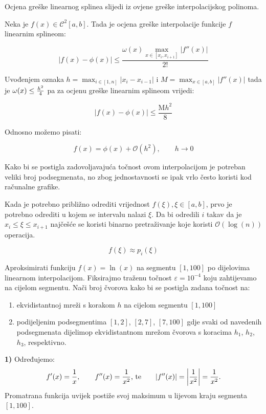 Ocjena greške linearnog splinea slijedi iz ovjene greške interpolacijskog polinoma.

Neka je $f(x)\in\mathcal{C}^2[a,b]$. Tada je ocjena greške interpolacije funkcije $f$ linearnim splineom:

$$
|f(x)-\phi(x)| \leq \frac{\omega(x)\max_{x\in[x_i,x_{i+1}]}|f''(x)|}{2!}
$$

Uvođenjem oznaka $h=\max_{i\in[1,n]}|x_i-x_{i-1}|$ i $M=\max_{x\in[a,b]}|f''(x)|$ tada je $\omega(x)\leq{h^2\over4}$ pa za ocjenu greške linearnim splineom vrijedi:

$$
|f(x) - \phi(x)|\leq \frac{\text{M}h^2}{8}
$$

Odnosno možemo pisati:

\begin{equation*}
    f(x) = \phi(x) + \mathcal{O}(h^2),\qquad h\to0
\end{equation*}

Kako bi se postigla zadovoljavajuća točnost ovom interpolacijom je potreban veliki broj podsegmenata, no zbog jednostavnosti se ipak vrlo često koristi kod računalne grafike.

Kada je potrebno približno odrediti vrijednost $f(\xi), \xi\in[a,b]$, prvo je potrebno odrediti u kojem se intervalu nalazi $\xi$. Da bi odredili $i$ takav da je $x_i\leq\xi\leq x_{i+1}$ najčešće se koristi binarno pretraživanje koje koristi $\mathcal{O}(\log(n))$ operacija.

$$
f(\xi)\approx p_i(\xi)
$$

\newpage

\begin{examplebox}
    Aproksimirati funkciju $f(x) = \ln(x)$ na segmentu $[1,100]$ po dijelovima linearnom interpolacijom. Fiksirajmo traženu točnost $\varepsilon = 10^{-4}$ koju zahtijevamo na cijelom segmentu. Nači broj čvorova kako bi se postigla zadana točnost na:

    \begin{enumerate}
        \item ekvidistantnoj mreži s korakom $h$ na cijelom segmentu $[1,100]$
        \item podijeljenim podsegmentima $[1,2]$, $[2,7]$, $[7,100]$ gdje svaki od navedenih podsegmenata dijelimop ekvidistantnom mrežom čvorova s koracima $h_1$, $h_2$, $h_3$, respektivno.
    \end{enumerate}
\end{examplebox}

\textbf{1)} Određujemo:
    $$
    f'(x) = {1\over x},\qquad f''(x)={1\over x^2}\text{, te}\qquad |f''(x)|=\left|{1\over x^2}\right|={1\over x^2}.
    $$
    Promatrana funkcija uvijek postiže svoj maksimum u lijevom kraju segmenta $[1,100]$.

